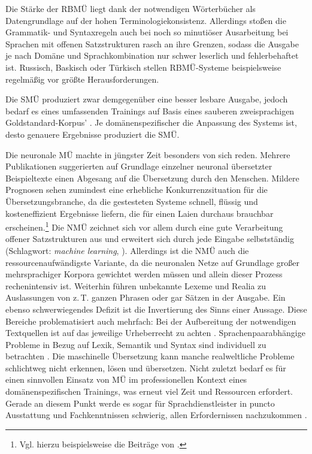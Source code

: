 Die Stärke der RBMÜ liegt dank der notwendigen Wörterbücher als Datengrundlage auf der hohen Terminologiekonsistenz. Allerdings stoßen die Gram\-ma\-tik- und Syntaxregeln auch bei noch so minutiöser Ausarbeitung bei Sprachen mit offenen Satzstrukturen rasch an ihre Grenzen, sodass die Ausgabe je nach Domäne und Sprachkombination nur schwer leserlich und fehlerbehaftet ist. Russisch, Baskisch oder Türkisch stellen RBMÜ-Systeme beispielsweise regelmäßig vor größte Herausforderungen.

Die SMÜ produziert zwar demgegenüber eine besser lesbare Ausgabe, jedoch bedarf es eines umfassenden Trainings auf Basis eines sauberen zweisprachigen Goldstandard-Korpus' \citep[44]{bowker_machine_2019}. Je domänenspezifischer die Anpassung des Systems ist, desto genauere Ergebnisse produziert die SMÜ. 

Die neuronale MÜ machte in jüngster Zeit besonders von sich reden. Mehrere Publikationen suggerierten auf Grundlage einzelner neuronal übersetzter Beispieltexte einen Abgesang auf die Übersetzung durch den Menschen. Mildere Prognosen sehen zumindest eine erhebliche Konkurrenzsituation für die Übersetzungsbranche, da die gestesteten Systeme schnell, flüssig und kosteneffizient Ergebnisse liefern, die für einen Laien durchaus brauchbar erscheinen.\footnote{Vgl. hierzu beispielsweise die Beiträge von \citet{holzki_digitale_2020, himmelein_smarte_2019}.} Die NMÜ zeichnet sich vor allem durch eine gute Verarbeitung offener Satzstrukturen aus und erweitert sich durch jede Eingabe selbstständig (Schlagwort: \emph{machine learning}, \citealt[45]{bowker_machine_2019}). Allerdings ist die NMÜ auch die ressourcenaufwändigste Variante, da die neuronalen Netze auf Grundlage großer mehrsprachiger Korpora gewichtet werden müssen und allein dieser Prozess rechenintensiv ist. Weiterhin führen unbekannte Lexeme und Realia zu Auslassungen von z.\,T. ganzen Phrasen oder gar Sätzen in der Ausgabe. Ein ebenso schwerwiegendes Defizit ist die Invertierung des Sinns einer Aussage. Diese Bereiche problematisiert auch \citeauthor{koehn_neural_2020} mehrfach: Bei der Aufbereitung der notwendigen Textquellen ist auf das jeweilige Urheberrecht zu achten \citep[7]{koehn_neural_2020}. Sprachenpaarabhängige Probleme in Bezug auf Lexik, Semantik und Syntax sind individuell zu betrachten \citep[9]{koehn_neural_2020}. Die maschinelle Übersetzung kann manche realweltliche Probleme schlichtweg nicht erkennen, lösen und übersetzen. Nicht zuletzt bedarf es für einen sinnvollen Einsatz von MÜ im professionellen Kontext eines domänenspezifischen Trainings, was erneut viel Zeit und Ressourcen erfordert. Gerade an diesem Punkt werde es sogar für Sprachdienstleister in puncto Ausstattung und Fachkenntnissen schwierig, allen Erfordernissen nachzukommen \citep[22]{koehn_neural_2020}.


